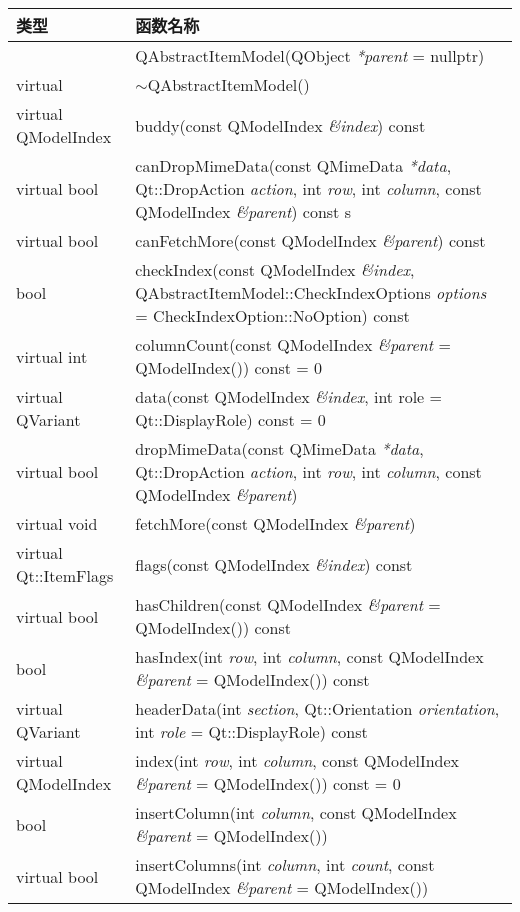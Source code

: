 \begin{longtable}[l]{|m{10em}|m{30em}|}
\hline
类型 & 函数名称 \\
\hline
& QAbstractItemModel(QObject \emph{*parent} = nullptr)\\
\hline
virtual	& $\sim$QAbstractItemModel()\\
\hline
virtual QModelIndex	& buddy(const QModelIndex \emph{\&index}) const\\
\hline
virtual bool & canDropMimeData(const QMimeData \emph{*data}, Qt::DropAction
               \emph{action}, int \emph{row}, int \emph{column}, const QModelIndex
               \emph{\&parent}) const s\\
\hline
virtual bool &canFetchMore(const QModelIndex \emph{\&parent}) const\\
\hline
bool & checkIndex(const QModelIndex \emph{\&index},
       QAbstractItemModel::CheckIndexOptions \emph{options} =
       CheckIndexOption::NoOption) const\\
\hline
virtual int&columnCount(const QModelIndex \emph{\&parent} = QModelIndex())
             const = 0\\
\hline
virtual QVariant&	data(const QModelIndex \emph{\&index}, int role = Qt::DisplayRole) const = 0\\
\hline
virtual bool&	dropMimeData(const QMimeData \emph{*data}, Qt::DropAction
\emph{action}, int \emph{row}, int \emph{column}, const QModelIndex \emph{\&parent})\\
\hline
virtual void&	fetchMore(const QModelIndex \emph{\&parent})\\
\hline
virtual Qt::ItemFlags&	flags(const QModelIndex \emph{\&index}) const\\
\hline
virtual bool&	hasChildren(const QModelIndex \emph{\&parent} = QModelIndex()) const\\
\hline
bool	&hasIndex(int \emph{row}, int \emph{column}, const QModelIndex \emph{\&parent} = QModelIndex()) const\\
\hline
virtual QVariant	&headerData(int \emph{section}, Qt::Orientation \emph{orientation}, int \emph{role} = Qt::DisplayRole) const\\
\hline
virtual QModelIndex& index(int \emph{row}, int \emph{column}, const QModelIndex \emph{\&parent} = QModelIndex()) const = 0\\
\hline
bool	&insertColumn(int \emph{column}, const QModelIndex \emph{\&parent} = QModelIndex())\\
\hline
virtual bool & insertColumns(int \emph{column}, int  \emph{count}, const QModelIndex \emph{\&parent} = QModelIndex())\\

\end{longtable}
